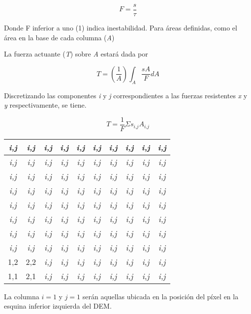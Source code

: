 $$F =\frac{\textit{s}}{\tau}$$

Donde F inferior a uno (1) indica inestabilidad. Para \'areas definidas, como el \'area en la base de cada columna (\textit{A})

La fuerza actuante (\textit{T}) sobre \textit{A} estar\'a dada por

$$\textit{T}=\left(\frac{1}{\textit{A}}\right)\int_{\textit{A}}^{} \frac{\textit{s}\textit{A}}{\textit{F}} \textit{dA}$$

Discretizando las componentes \textit{i} y \textit{j} correspondientes a las fuerzas resistentes \textit{x} y \textit{y} respectivamente, se tiene.

$$\textit{T} = \frac{1}{\textit{F}} \Sigma\textit{s}_{\textit{i,j}} \textit{A}_{\textit{i,j}}$$

\begin{center}


\begin{tabular}{|c|c|c|c|c|c|c|c|c|c|}
\hline 
\textit{i,j} & \textit{i,j} & \textit{i,j} & \textit{i,j} & \textit{i,j} & \textit{i,j} & \textit{i,j} & \textit{i,j} & \textit{i,j} & \textit{i,j} \\ 
\hline 
\textit{i,j}& \textit{i,j}& \textit{i,j} & \textit{i,j} &\textit{i,j} & \textit{i,j} & \textit{i,j} & \textit{i,j} & \textit{i,j} & \textit{i,j} \\ 
\hline 
\textit{i,j} & \textit{i,j} & \textit{i,j} & \textit{i,j} & \textit{i,j} & \textit{i,j} & \textit{i,j} & \textit{i,j} & \textit{i,j} & \textit{i,j} \\ 
\hline 
\textit{i,j} & \textit{i,j} & \textit{i,j} & \textit{i,j} & \textit{i,j} & \textit{i,j} & \textit{i,j} & \textit{i,j} & \textit{i,j} & \textit{i,j} \\ 
\hline 
\textit{i,j} & \textit{i,j} & \textit{i,j} & \textit{i,j} & \textit{i,j} & \textit{i,j} & \textit{i,j} & \textit{i,j} & \textit{i,j} & \textit{i,j} \\ 
\hline 
\textit{i,j}& \textit{i,j}& \textit{i,j}& \textit{i,j} & \textit{i,j}& \textit{i,j}& \textit{i,j} & \textit{i,j} &\textit{i,j} & \textit{i,j} \\ 
\hline 
\textit{i,j} &\textit{i,j} & \textit{i,j} & \textit{i,j} & \textit{i,j} & \textit{i,j}& \textit{i,j}& \textit{i,j} & \textit{i,j}& \textit{i,j} \\ 
\hline 
\textit{i,j} & \textit{i,j}& \textit{i,j}& \textit{i,j} & \textit{i,j} & \textit{i,j} & \textit{i,j} & \textit{i,j}& \textit{i,j} & \textit{i,j}\\ 
\hline 
1,2 & 2,2 & \textit{i,j} & \textit{i,j} & \textit{i,j} & \textit{i,j}& \textit{i,j} & \textit{i,j} & \textit{i,j}& \textit{i,j}\\ 
\hline 
1,1 & 2,1 & \textit{i,j}& \textit{i,j} & \textit{i,j} & \textit{i,j} & \textit{i,j} & \textit{i,j}& \textit{i,j} & \textit{i,j}\\ 
\hline 
\end{tabular} 
\end{center}
La columna $\textit{i}=1$ y $\textit{j}=1$ ser\'an aquellas ubicada en la posici\'on del p\'ixel en la esquina inferior izquierda del DEM.

